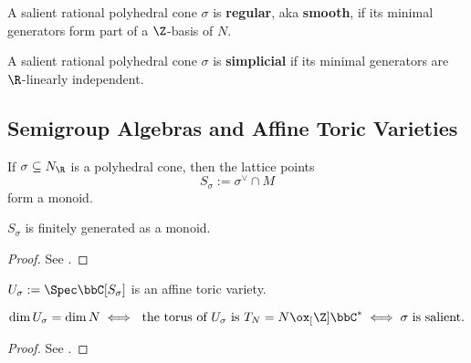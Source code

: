 \begin{definition}
  \label{1-2-16-reg-cone}

  A salient rational polyhedral cone $\sigma$ is {\bf regular}, aka {\bf smooth}, if its minimal generators form part of a $\Z$-basis of $N$.
\end{definition}


\begin{definition}
  \label{1-2-16-simplicial-cone}

  A salient rational polyhedral cone $\sigma$ is {\bf simplicial} if its minimal generators are $\R$-linearly independent.
\end{definition}


\subsection{Semigroup Algebras and Affine Toric Varieties}


\begin{definition}
  \label{1-2-17-dual-lat-cone}

  If $\sigma \subseteq N_\R$ is a polyhedral cone, then the lattice points
  \[
    S_\sigma := \sigma^\vee \cap M
  \]
  form a monoid.
\end{definition}


\begin{proposition}
  \label{1-2-17-gordan-lemma}

  $S_\sigma$ is finitely generated as a monoid.
\end{proposition}
\begin{proof}

  See \cite{Cox_2011}.
\end{proof}


\begin{definition}
  \label{1-2-18-aff-tor-var-rat-polyhedral-cone}

  $U_\sigma := \Spec \bbC[S_\sigma]$ is an affine toric variety.
\end{definition}


\begin{theorem}
  \label{1-2-18-dim-aff-tor-var-rat-polyhedral-cone}

  \[
    \dim U_\sigma = \dim N \iff \text{ the torus of $U_\sigma$ is } T_N = N \ox_[\Z] \bbC^* \iff \sigma \text{ is salient}.
  \]
\end{theorem}
\begin{proof}

  See \cite{Cox_2011}.
\end{proof}


